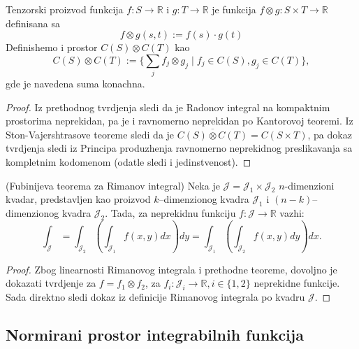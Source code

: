 \documentclass[a4paper,12pt]{article}
\newcommand{\RR}{\mathbb{R}}
\begin{document}
\begin{nap}
	Tenzorski proizvod funkcija $f:S\to \RR$ i $g:T\to \RR$ je funkcija $f\otimes g:S\times T \to \RR$
	definisana sa 
	\[ f\otimes g(s, t) := f(s)\cdot g(t) \] 
	Definishemo i prostor $C(S)\otimes C(T)$ kao
	\[ C(S)\otimes C(T) := \Big\{\sum_j f_j\otimes g_j\mid f_j \in C(S), g_j \in C(T)\Big\},\] 
	gde je navedena suma konachna.
\end{nap}
\begin{proof}
	Iz prethodnog tvrdjenja sledi da je Radonov integral na kompaktnim prostorima neprekidan,
	pa je i ravnomerno neprekidan po Kantorovoj teoremi. Iz Ston-Vajershtrasove teoreme sledi
	da je $\overline{C(S)\otimes C(T)} = C(S\times T)$, pa dokaz tvrdjenja sledi iz Principa
	produzhenja ravnomerno neprekidnog preslikavanja sa kompletnim kodomenom (odatle 
	sledi i jedinstvenost).
\end{proof}

\begin{posl}(Fubinijeva teorema za Rimanov integral)
	Neka je $\mathcal{J} = \mathcal{J}_1 \times \mathcal{J}_2$ $n$-dimenzioni kvadar,
	predstavljen kao proizvod $k$--dimenzionog kvadra $\mathcal J_1$ i $(n-k)$--dimenzionog kvadra $\mathcal J_2$.
	Tada, za neprekidnu funkciju $f:\mathcal{J}\to \RR$ vazhi:
	\[ \int_{\mathcal J} = \int_{\mathcal J_2} \left(\int_{\mathcal J_1}f(x, y) dx \right) dy = \int_{\mathcal J_1} \left(\int_{\mathcal J_2}f(x, y) dy \right) dx.\] 
\end{posl}
\begin{proof}
	Zbog linearnosti Rimanovog integrala i prethodne teoreme, dovoljno je dokazati tvrdjenje
	za $f = f_1 \otimes f_2$, za $f_i:\mathcal J_i \to \RR, i \in \{1, 2\}$ neprekidne funkcije.
	Sada direktno sledi dokaz iz definicije Rimanovog integrala po kvadru $\mathcal J$.
\end{proof}

\subsection{Normirani prostor integrabilnih funkcija}
\end{document}
